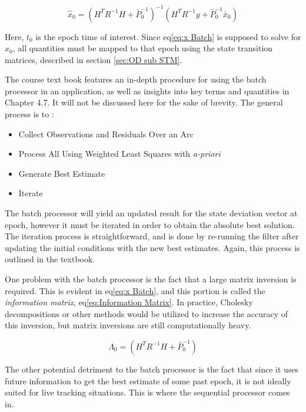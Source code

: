 \documentclass[12pt,a4paper,oneside]{article}
\numberwithin{equation}{section}   		%
\begin{document}
\begin{equation}
	\hat{x}_0 = (H^T R^{-1} H + \bar{P}_0^{-1})^{-1}   (H^T R^{-1} y + \bar{P}_0^{-1} \bar{x}_0)
	\label{eq:x Batch}
\end{equation}

Here, $t_0$ is the epoch time of interest. Since eq\eqref{eq:x Batch} is supposed to solve for $\hat{x}_0$, all quantities must be mapped to that epoch using the state transition matrices, described in section \ref{sec:OD sub STM}.

The course text book features an in-depth procedure for using the batch processor in an application, as well as insights into key terms and quantities in Chapter 4.7. It will not be discussed here for the sake of brevity. The general process is to \cite{5070LEC}:

\begin{itemize}
	\renewcommand{\labelitemi}{$\bullet$}
	\item Collect Observations and Residuals Over an  Arc
	\item Process All Using Weighted Least Squares with \emph{a-priori}
	\item Generate Best Estimate
	\item Iterate
\end{itemize}


The batch processor will yield an updated result for the state deviation vector at epoch, however it must be iterated in order to obtain the absolute best solution. The iteration process is straightforward, and is done by re-running the filter after updating the initial conditions with the new best estimates. Again, this process is outlined in the textbook. 

One problem with the batch processor is the fact that a large matrix inversion is required. This is evident in eq\eqref{eq:x Batch}, and this portion is called the \emph{information matrix}, eq\eqref{eq:Information Matrix}. In practice, Cholesky decompositions or other methods would be utilized to increase the accuracy of this inversion, but matrix inversions are still computationally heavy. 

\begin{equation}
	\Lambda_0 = (H^T R^{-1} H + \bar{P}_0^{-1})
	\label{eq:Information Matrix}
\end{equation}


The other potential detriment to the batch processor is the fact that since it uses future information to get the best estimate of some past epoch, it is not ideally suited for live tracking situations. This is where the sequential processor comes in. 
\end{document}
